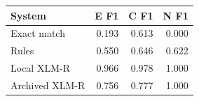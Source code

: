 \begin{tabular}{lrrr}
\toprule
System & E F1 & C F1 & N F1 \\
\midrule
Exact match & 0.193 & 0.613 & 0.000 \\
Rules & 0.550 & 0.646 & 0.622 \\
Local XLM-R & 0.966 & 0.978 & 1.000 \\
Archived XLM-R & 0.756 & 0.777 & 1.000 \\
\bottomrule
\end{tabular}
